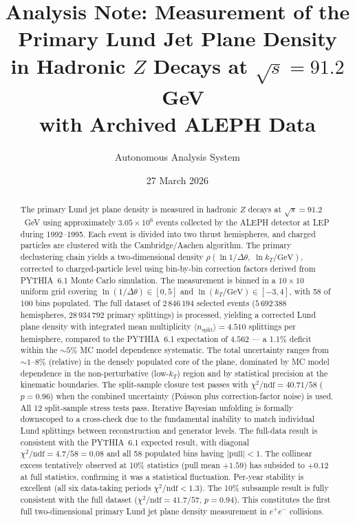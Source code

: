 \documentclass[11pt,a4paper]{article}
\title{Analysis Note: Measurement of the Primary Lund Jet Plane Density\\
in Hadronic $Z$ Decays at $\sqrt{s} = 91.2$~GeV\\
with Archived ALEPH Data}
\author{Autonomous Analysis System}
\date{27 March 2026}
\begin{document}
\maketitle

\begin{abstract}
The primary Lund jet plane density is measured in hadronic $Z$ decays
at $\sqrt{s} = 91.2$~GeV using approximately $3.05 \times 10^6$
events collected by the ALEPH detector at LEP during 1992--1995.
Each event is divided into two thrust hemispheres, and charged
particles are clustered with the Cambridge/Aachen algorithm.
The primary declustering chain yields a two-dimensional density
$\rho(\ln 1/\Delta\theta,\;\ln k_T/\text{GeV})$, corrected to
charged-particle level using bin-by-bin correction factors derived
from PYTHIA~6.1 Monte Carlo simulation.  The measurement is binned in a
$10 \times 10$ uniform grid covering $\ln(1/\Delta\theta) \in [0, 5]$
and $\ln(k_T/\text{GeV}) \in [-3, 4]$, with 58 of 100 bins
populated.  The full dataset of $2\,846\,194$ selected events
($5\,692\,388$ hemispheres, $28\,934\,792$ primary splittings)
is processed, yielding a corrected Lund plane density with integrated
mean multiplicity $\langle n_\text{split} \rangle = 4.510$ splittings
per hemisphere, compared to the PYTHIA~6.1 expectation of $4.562$
--- a 1.1\% deficit within the $\sim\!5\%$ MC model dependence
systematic.  The total uncertainty ranges from $\sim\!1$--$8\%$
(relative) in the densely populated core of the plane, dominated by
MC model dependence in the non-perturbative (low-$k_T$) region and by
statistical precision at the kinematic boundaries.  The split-sample
closure test passes with $\chi^2/\text{ndf} = 40.71/58$ ($p = 0.96$)
when the combined uncertainty (Poisson plus correction-factor noise)
is used.  All 12 split-sample stress tests pass.  Iterative Bayesian
unfolding is formally downscoped to a cross-check due to the
fundamental inability to match individual Lund splittings between
reconstruction and generator levels.  The full-data result is
consistent with the PYTHIA~6.1 expected result, with diagonal
$\chi^2/\text{ndf} = 4.7/58 = 0.08$ and all 58 populated bins
having $|\text{pull}| < 1$.  The collinear excess tentatively observed
at 10\% statistics (pull mean $+1.59$) has subsided to $+0.12$ at
full statistics, confirming it was a statistical fluctuation.
Per-year stability is excellent (all six data-taking periods
$\chi^2/\text{ndf} < 1.3$).  The 10\% subsample result is fully
consistent with the full dataset ($\chi^2/\text{ndf} = 41.7/57$,
$p = 0.94$).  This constitutes the first full two-dimensional primary
Lund jet plane density measurement in $e^+e^-$ collisions.
\end{abstract}
\end{document}
